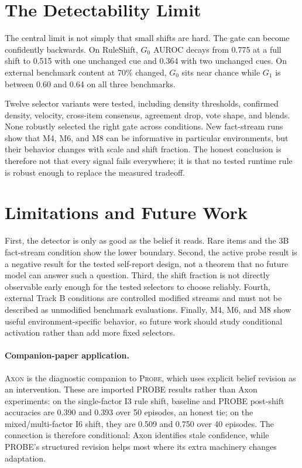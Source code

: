 \documentclass[pdflatex,sn-basic]{sn-jnl}
\theoremstyle{definition}
\newcommand{\axon}{\textsc{Axon}}
\newcommand{\probe}{\textsc{Probe}}
\begin{document}
\section{The Detectability Limit}
\label{sec:limit}

The central limit is not simply that small shifts are hard. The gate can become confidently
backwards. On RuleShift, $G_0$ AUROC decays from 0.775 at a full shift to 0.515 with one
unchanged cue and 0.364 with two unchanged cues. On external benchmark content at 70\% changed,
$G_0$ sits near chance while $G_1$ is between 0.60 and 0.64 on all three benchmarks.

Twelve selector variants were tested, including density thresholds, confirmed density,
velocity, cross-item consensus, agreement drop, vote shape, and blends. None robustly selected
the right gate across conditions. New fact-stream runs show that M4, M6, and M8 can be
informative in particular environments, but their behavior changes with scale and shift
fraction. The honest conclusion is therefore not that every signal fails everywhere; it is
that no tested runtime rule is robust enough to replace the measured tradeoff.

\section{Limitations and Future Work}
\label{sec:limitations}

First, the detector is only as good as the belief it reads. Rare items and the 3B fact-stream
condition show the lower boundary. Second, the active probe result is a negative result for
the tested self-report design, not a theorem that no future model can answer such a question.
Third, the shift fraction is not directly observable early enough for the tested selectors to
choose reliably. Fourth, external Track B conditions are controlled modified streams and must
not be described as unmodified benchmark evaluations. Finally, M4, M6, and M8 show useful
environment-specific behavior, so future work should study conditional activation rather than
add more fixed selectors.

\paragraph{Companion-paper application.}
\axon{} is the diagnostic companion to \probe{}, which uses explicit belief revision as an
intervention. These are imported PROBE results rather than Axon experiments: on the
single-factor I3 rule shift, baseline and PROBE post-shift accuracies are 0.390 and 0.393
over 50 episodes, an honest tie; on the mixed/multi-factor I6 shift, they are 0.509 and 0.750
over 40 episodes. The connection is therefore conditional: Axon identifies stale confidence,
while PROBE's structured revision helps most where its extra machinery changes adaptation.
\end{document}
